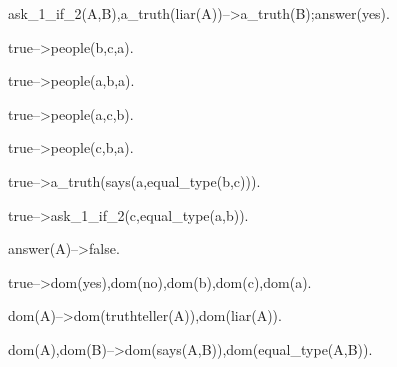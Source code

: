 ask_1_if_2(A,B),a_truth(liar(A))-->a_truth(B);answer(yes).

true-->people(b,c,a).

true-->people(a,b,a).

true-->people(a,c,b).

true-->people(c,b,a).

true-->a_truth(says(a,equal_type(b,c))).

true-->ask_1_if_2(c,equal_type(a,b)).

answer(A)-->false.

true-->dom(yes),dom(no),dom(b),dom(c),dom(a).

dom(A)-->dom(truthteller(A)),dom(liar(A)).

dom(A),dom(B)-->dom(says(A,B)),dom(equal_type(A,B)).

